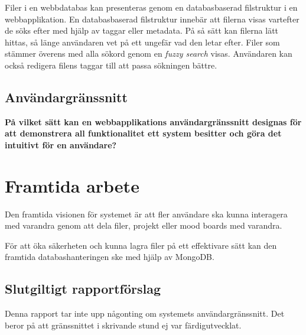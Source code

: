 Filer i en webbdatabas kan presenteras genom en databasbaserad filstruktur i en
webbapplikation. En databasbaserad filstruktur innebär att filerna visas
vartefter de söks efter med hjälp av taggar eller metadata. På så sätt kan
filerna lätt hittas, så länge användaren vet på ett ungefär vad den letar efter.
Filer som stämmer överens med alla sökord genom en \emph{fuzzy search} visas.
Användaren kan också redigera filens taggar till att passa sökningen bättre.

\subsection{Användargränssnitt}

\textbf{På vilket sätt kan en webbapplikations användargränssnitt designas för
att demonstrera all funktionalitet ett system besitter och göra det intuitivt
för en användare?}

\section{Framtida arbete}
Den framtida visionen för systemet är att fler användare ska kunna interagera med varandra genom att dela filer, projekt eller mood boards med varandra.

För att öka säkerheten och kunna lagra filer på ett effektivare sätt kan den
framtida databashanteringen ske med hjälp av MongoDB.

\subsection{Slutgiltigt rapportförslag}
Denna rapport tar inte upp någonting om systemets användargränssnitt. Det beror
på att gränssnittet i skrivande stund ej var färdigutvecklat.
